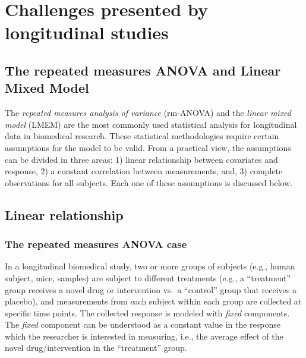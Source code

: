 \documentclass[
]{article}
\begin{document}
\hypertarget{challenges-presented-by-longitudinal-studies}{%
\section{Challenges presented by longitudinal studies}\label{challenges-presented-by-longitudinal-studies}}

\hypertarget{the-repeated-measures-anova-and-linear-mixed-model}{%
\subsection{The repeated measures ANOVA and Linear Mixed Model}\label{the-repeated-measures-anova-and-linear-mixed-model}}

The \emph{repeated measures analysis of variance} (rm-ANOVA) and the \emph{linear mixed model} (LMEM) are the most commonly used statistical analysis for longitudinal data in biomedical research. These statistical methodologies require certain assumptions for the model to be valid. From a practical view, the assumptions can be divided in three areas: 1) linear relationship between covariates and response, 2) a constant correlation between measurements, and, 3) complete observations for all subjects. Each one of these assumptions is discussed below.

\hypertarget{linear-relationship}{%
\subsection{Linear relationship}\label{linear-relationship}}

\hypertarget{the-repeated-measures-anova-case}{%
\subsubsection{The repeated measures ANOVA case}\label{the-repeated-measures-anova-case}}

In a longitudinal biomedical study, two or more groups of subjects (e.g., human subject, mice, samples) are subject to different treatments (e.g., a ``treatment'' group receives a novel drug or intervention vs.~a ``control'' group that receives a placebo), and measurements from each subject within each group are collected at specific time points. The collected response is modeled with \emph{fixed} components. The \emph{fixed} component can be understood as a constant value in the response which the researcher is interested in measuring, i.e., the average effect of the novel drug/intervention in the ``treatment'' group.
\end{document}
